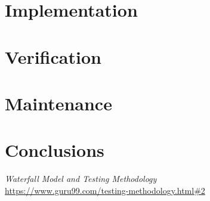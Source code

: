 \documentclass[12pt]{article}
\begin{document}
\begin{myspace}{1.7}
\section*{Implementation}


%
%
\pagebreak
\section*{Verification}






%
%
\pagebreak
\section*{Maintenance}  





%
%
\pagebreak
\section*{Conclusions}  





%
%
\pagebreak
\begin{thebibliography}{9}
   \textit{Waterfall Model and Testing Methodology}\\
   \url{https://www.guru99.com/testing-methodology.html#2}

\end{thebibliography}
  
\end{myspace}
\end{document}

